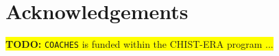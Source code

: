 \documentclass{llncs}
\newcommand{\todo}[1]
{\colorbox{yellow}{{\bf TODO:} #1}}
\def\coaches{{\tt COACHES} }
\begin{document}










\section*{Acknowledgements}

\todo{\coaches is funded within the CHIST-ERA program ...}



\end{document}
